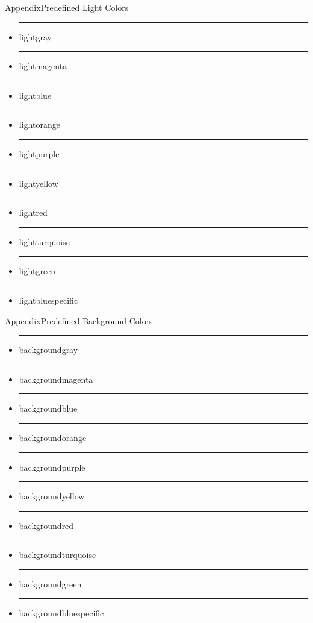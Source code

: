\documentclass{beamer}
\begin{document}
\begin{frame}{Appendix}{Predefined Light Colors}
	\begin{itemize}
		\item {\color{lightgray}\rule{.7cm}{.4cm} lightgray}
		\item {\color{lightmagenta}\rule{.7cm}{.4cm} lightmagenta}
		\item {\color{lightblue}\rule{.7cm}{.4cm} lightblue}
		\item {\color{lightorange}\rule{.7cm}{.4cm} lightorange}
		\item {\color{lightpurple}\rule{.7cm}{.4cm} lightpurple}
		\item {\color{lightyellow}\rule{.7cm}{.4cm} lightyellow}
		\item {\color{lightred}\rule{.7cm}{.4cm} lightred}
		\item {\color{lightturquoise}\rule{.7cm}{.4cm} lightturquoise}
		\item {\color{lightgreen}\rule{.7cm}{.4cm} lightgreen}
		\item {\color{lightbluespecific}\rule{.7cm}{.4cm} lightbluespecific}
	\end{itemize}
\end{frame}

\begin{frame}{Appendix}{Predefined Background Colors}
	\begin{itemize}
		\item {\color{backgroundgray}\rule{.7cm}{.4cm}} backgroundgray
		\item {\color{backgroundmagenta}\rule{.7cm}{.4cm}} backgroundmagenta
		\item {\color{backgroundblue}\rule{.7cm}{.4cm}} backgroundblue
		\item {\color{backgroundorange}\rule{.7cm}{.4cm}} backgroundorange
		\item {\color{backgroundpurple}\rule{.7cm}{.4cm}} backgroundpurple
		\item {\color{backgroundyellow}\rule{.7cm}{.4cm}} backgroundyellow
		\item {\color{backgroundred}\rule{.7cm}{.4cm}} backgroundred
		\item {\color{backgroundturquoise}\rule{.7cm}{.4cm}} backgroundturquoise
		\item {\color{backgroundgreen}\rule{.7cm}{.4cm}} backgroundgreen
		\item {\color{backgroundbluespecific}\rule{.7cm}{.4cm}} backgroundbluespecific
	\end{itemize}
\end{frame}
\end{document}
